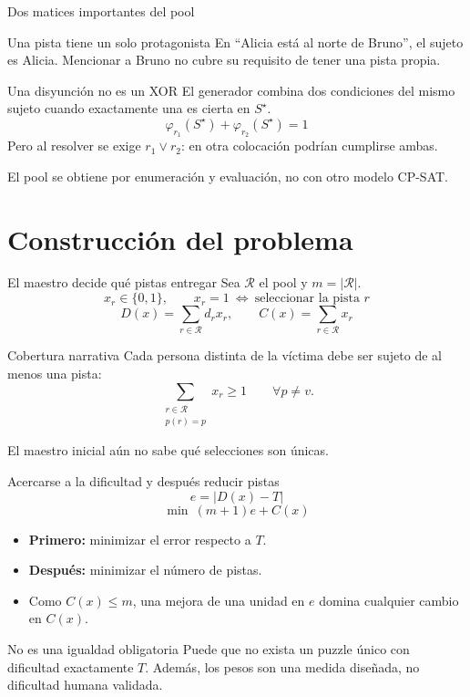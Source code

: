 \documentclass[aspectratio=169,11pt]{beamer}
\begin{document}
\begin{frame}{Dos matices importantes del pool}
  \begin{block}{Una pista tiene un solo protagonista}
    En ``Alicia est\'a al norte de Bruno'', el sujeto es Alicia.
    Mencionar a Bruno no cubre su requisito de tener una pista propia.
  \end{block}
  \vspace{2mm}
  \begin{block}{Una disyunci\'on no es un XOR}
    El generador combina dos condiciones del mismo sujeto cuando
    exactamente una es cierta en \(S^\star\).
    \[
      \varphi_{r_1}(S^\star)+\varphi_{r_2}(S^\star)=1
    \]
    Pero al resolver se exige \(r_1\lor r_2\):
    en otra colocaci\'on podr\'ian cumplirse ambas.
  \end{block}
  \small El pool se obtiene por enumeraci\'on y evaluaci\'on,
  no con otro modelo CP-SAT.
\end{frame}

\section{Construcci\'on del problema}

\begin{frame}{El maestro decide qu\'e pistas entregar}
  Sea \(\mathcal R\) el pool y \(m=|\mathcal R|\).
  \[
    x_r\in\{0,1\},\qquad
    x_r=1\ \Longleftrightarrow\ \text{seleccionar la pista }r
  \]
  \[
    D(x)=\sum_{r\in\mathcal R}d_rx_r,\qquad
    C(x)=\sum_{r\in\mathcal R}x_r
  \]
  \begin{block}{Cobertura narrativa}
    Cada persona distinta de la v\'ictima debe ser sujeto de al menos una pista:
    \[
      \sum_{\substack{r\in\mathcal R\\p(r)=p}}x_r\geq1
      \qquad \forall p\neq v.
    \]
  \end{block}
  \small El maestro inicial a\'un no sabe qu\'e selecciones son \'unicas.
\end{frame}

\begin{frame}{Acercarse a la dificultad y despu\'es reducir pistas}
  \[
    e=|D(x)-T|
  \]
  \[
    \boxed{\min\ (m+1)e+C(x)}
  \]
  \begin{itemize}
    \setlength{\itemsep}{3mm}
    \item \textbf{Primero:} minimizar el error respecto a \(T\).
    \item \textbf{Despu\'es:} minimizar el n\'umero de pistas.
    \item Como \(C(x)\leq m\), una mejora de una unidad en \(e\)
      domina cualquier cambio en \(C(x)\).
  \end{itemize}
  \begin{alertblock}{No es una igualdad obligatoria}
    Puede que no exista un puzzle \'unico con dificultad exactamente \(T\).
    Adem\'as, los pesos son una medida dise\~nada, no dificultad humana validada.
  \end{alertblock}
\end{frame}
\end{document}

